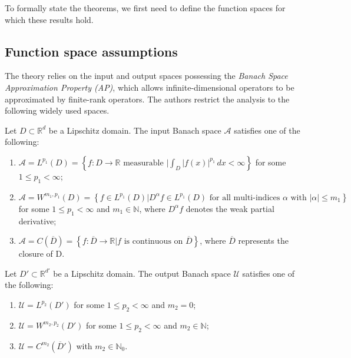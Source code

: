 To formally state the theorems, we first need to define the function spaces for which these results hold.

\subsection{Function space assumptions}

The theory relies on the input and output spaces possessing the \textit{Banach Space Approximation Property (AP)}, which allows infinite-dimensional operators to be approximated by finite-rank operators. The authors restrict the analysis to the following widely used spaces.

\begin{assumption}
Let $D \subset \mathbb{R}^d$ be a Lipschitz domain. The input Banach space $\mathcal{A}$ satisfies one of the following:
\begin{enumerate}
    \item $\mathcal{A} = L^{p_1}(D) = \left\{ f: D \to \mathbb{R} \text{ measurable } \mathrel{\Big|} \int_D |f(x)|^{p_1} \, dx < \infty \right\}$ for some $1 \le p_1 < \infty$;
    \item $\mathcal{A} = W^{m_1,p_1}(D) = \left\{ f \in L^{p_1}(D) \mathrel{\Big|} D^\alpha f \in L^{p_1}(D) \text{ for all multi-indices } \alpha \text{ with } |\alpha| \le m_1 \right\}$ for some $1 \le p_1 < \infty$ and $m_1 \in \mathbb{N}$, where $D^\alpha f$ denotes the weak partial derivative;
    \item $\mathcal{A} = C(\overline{D}) = \left\{ f: \overline{D} \to \mathbb{R} \mathrel{\Big|} f \text{ is continuous on } \overline{D} \right\}$, where $\overline{D}$ represents the closure of D.
\end{enumerate}
\end{assumption}

\begin{assumption}
Let $D' \subset \mathbb{R}^{d'}$ be a Lipschitz domain. The output Banach space $\mathcal{U}$ satisfies one of the following:
\begin{enumerate}
    \item $\mathcal{U} = L^{p_2}(D')$ for some $1 \le p_2 < \infty$ and $m_2 = 0$;
    \item $\mathcal{U} = W^{m_2,p_2}(D')$ for some $1 \le p_2 < \infty$ and $m_2 \in \mathbb{N}$;
    \item $\mathcal{U} = C^{m_2}(\overline{D}')$ with $m_2 \in \mathbb{N}_0$.
\end{enumerate}
\end{assumption}

